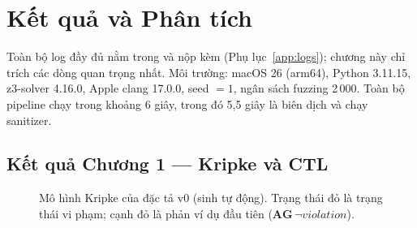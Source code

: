 \chapter{Kết quả và Phân tích}
\label{ch:ketqua}

Toàn bộ log đầy đủ nằm trong  và
 nộp kèm (Phụ lục~\ref{app:logs}); chương này chỉ trích các
dòng quan trọng nhất. Môi trường: macOS 26 (arm64), Python 3.11.15, z3-solver 4.16.0, Apple clang
17.0.0, seed $=1$, ngân sách fuzzing 2\,000. Toàn bộ pipeline chạy trong khoảng 6 giây, trong đó
5,5 giây là biên dịch và chạy sanitizer.

\section{Kết quả Chương 1 — Kripke và CTL}

\begin{figure}[H]
  \centering
  \caption{Mô hình Kripke của đặc tả v0 (sinh tự động). Trạng thái đỏ là trạng thái vi phạm;
           cạnh đỏ là phản ví dụ đầu tiên ($\mathbf{AG}\,\neg\mathit{violation}$).}
  \label{fig:kripke}
\end{figure}

